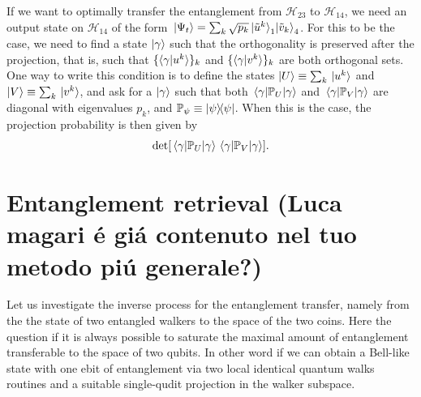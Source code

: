 \documentclass[
	aps, pra, authorblock, superscriptaddress, twocolumn,
	10pt
]{revtex4-1}
\newcommand{\PP}{\mathbb{P}}
\newcommand{\calH}{{\mathcal{H}}}
\begin{document}
If we want to optimally transfer the entanglement from $\calH_{23}$ to $\calH_{14}$, we need an output state on $\calH_{14}$ of the form
$\ket*{\Psi_t} = \sum_k \sqrt{p_k}\ket*{\tilde u^k}_1\!\!\ket*{\tilde v_k}_4$.
For this to be the case, we need to find a state $\ket\gamma$ such that the orthogonality is preserved after the projection, that is, such that $\{\!\braket*{\gamma}{u^k}\}_k$ and 
$\{\!\braket*{\gamma}{v^k}\}_k$ are both orthogonal sets.
One way to write this condition is to define the states
$\ket U\equiv\sum_k \ket*{u^k}$
and
$\ket V\equiv\sum_k \ket*{v^k}$,
and ask for a $\ket\gamma$ such that both
$\mel{\gamma}{\PP_U}{\gamma}$
and
$\mel{\gamma}{\PP_V}{\gamma}$
are diagonal with eigenvalues $p_k$,
and $\PP_\psi\equiv\ketbra{\psi}$.
When this is the case, the projection probability is then given by
\begin{equation}
    \det[
        \mel{\gamma}{\PP_U}{\gamma}\mel{\gamma}{\PP_V}{\gamma}
    ].
\end{equation}


\section{Entanglement retrieval (Luca magari \'e gi\'a contenuto nel tuo metodo pi\'u generale?)}

Let us investigate the inverse process for the entanglement transfer, namely from the the state of two entangled walkers to the space of the two coins. Here the question if it is always possible to saturate the maximal amount of entanglement transferable to the space of two qubits. In other word if we can obtain a Bell-like state with one ebit of entanglement via two local identical quantum walks routines and a suitable single-qudit projection in the walker subspace. 
\end{document}
